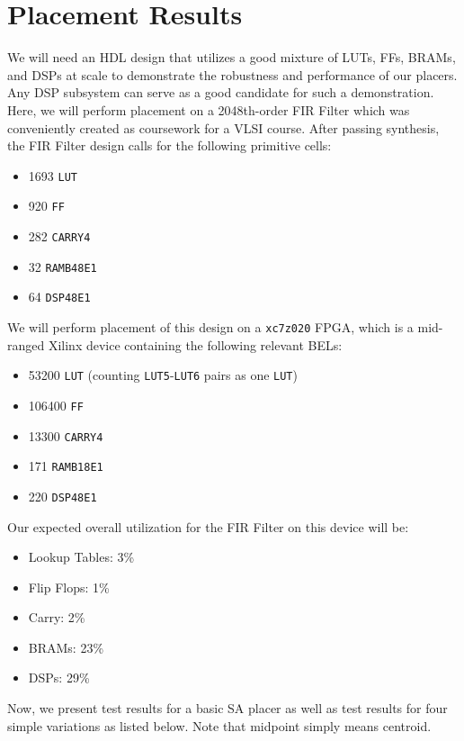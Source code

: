 \section{Placement Results}
\label{sec:results}


We will need an HDL design that utilizes a good mixture of LUTs, FFs, BRAMs, and DSPs at scale to demonstrate the robustness and performance of our placers. 
Any DSP subsystem can serve as a good candidate for such a demonstration. 
Here, we will perform placement on a 2048th-order FIR Filter which was conveniently created as coursework for a VLSI course. 
After passing synthesis, the FIR Filter design calls for the following primitive cells:



\begin{itemize}
    \item 1693 \texttt{LUT}
    \item 920 \texttt{FF}
    \item 282 \texttt{CARRY4}
    \item 32 \texttt{RAMB48E1}
    \item 64 \texttt{DSP48E1}
\end{itemize}

We will perform placement of this design on a \texttt{xc7z020} FPGA, which is a mid-ranged Xilinx device containing the following relevant BELs:
\begin{itemize}
    \item 53200 \texttt{LUT} (counting \texttt{LUT5}-\texttt{LUT6} pairs as one \texttt{LUT})
    \item 106400 \texttt{FF}
    \item 13300 \texttt{CARRY4}
    \item 171 \texttt{RAMB18E1}
    \item 220 \texttt{DSP48E1}
\end{itemize}

Our expected overall utilization for the FIR Filter on this device will be:
\begin{itemize}
    \item Lookup Tables: 3\%
    \item Flip Flops: 1\%
    \item Carry: 2\%
    \item BRAMs: 23\%
    \item DSPs: 29\%
\end{itemize}

Now, we present test results for a basic SA placer as well as test results for four simple variations as listed below. 
Note that midpoint simply means centroid.

